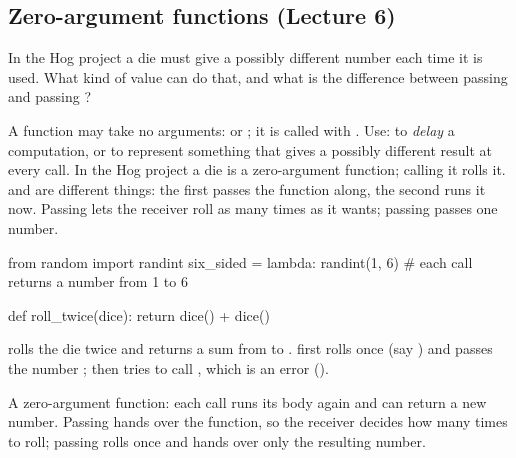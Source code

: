\documentclass[10pt]{scrartcl}
\begin{document}
\subsection{Zero-argument functions (Lecture 6)}
\begin{qbox}
  In the Hog project a die must give a possibly different number each time it is used. What kind of value can do that, and what is the difference between passing  and passing ?
\end{qbox}
\begin{itemize}
  \ii A function may take no arguments:  or ; it is called with .
  \ii Use: to \emph{delay} a computation, or to represent something that gives a possibly different result at every call. In the Hog project a die is a zero-argument function; calling it rolls it.
  \ii {} and  are different things: the first passes the function along, the second runs it now. Passing  lets the receiver roll as many times as it wants; passing  passes one number.
\end{itemize}
\begin{example*}
\begin{py}
from random import randint
six_sided = lambda: randint(1, 6)    # each call returns a number from 1 to 6

def roll_twice(dice):
    return dice() + dice()
\end{py}
 rolls the die twice and returns a sum from  to .  first rolls once (say ) and passes the number ; then  tries to call , which is an error ().
\end{example*}
\revisit A zero-argument function: each call  runs its body again and can return a new number. Passing  hands over the function, so the receiver decides how many times to roll; passing  rolls once and hands over only the resulting number.
\end{document}
